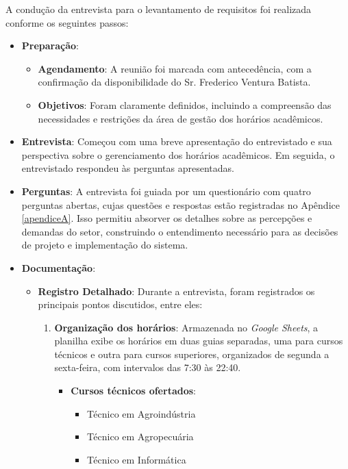 A condução da entrevista para o levantamento de requisitos foi realizada conforme os seguintes passos:
\begin{itemize}
    \item \textbf{Preparação}:
    \begin{itemize}
        \item \textbf{Agendamento}: A reunião foi marcada com antecedência, com a confirmação da disponibilidade do Sr. Frederico Ventura Batista.
        \item \textbf{Objetivos}: Foram claramente definidos, incluindo a compreensão das necessidades e restrições da área de gestão dos horários acadêmicos.
    \end{itemize}
    \item \textbf{Entrevista}: Começou com uma breve apresentação do entrevistado e sua perspectiva sobre o gerenciamento dos horários acadêmicos. Em seguida, o entrevistado respondeu às perguntas apresentadas.
    \item \textbf{Perguntas}: A entrevista foi guiada por um questionário com quatro perguntas abertas, cujas questões e respostas estão registradas no Apêndice \ref{apendiceA}. Isso permitiu absorver os detalhes sobre as percepções e demandas do setor, construindo o entendimento necessário para as decisões de projeto e implementação do sistema.
    \item \textbf{Documentação}:
    \begin{itemize}
        \item \textbf{Registro Detalhado}: Durante a entrevista, foram registrados os principais pontos discutidos, entre eles:
        \begin{enumerate}
            \item \textbf{Organização dos horários}: Armazenada no \textit{Google Sheets}, a planilha exibe os horários em duas guias separadas, uma para cursos técnicos e outra para cursos superiores, organizados de segunda a sexta-feira, com intervalos das 7:30 às 22:40.
            \begin{itemize}
                \item \textbf{Cursos técnicos ofertados}: 
                \begin{itemize}
                    \item Técnico em Agroindústria
                    \item Técnico em Agropecuária
                    \item Técnico em Informática
                \end{itemize}

\end{itemize}
\end{enumerate}
\end{itemize}
\end{itemize}
